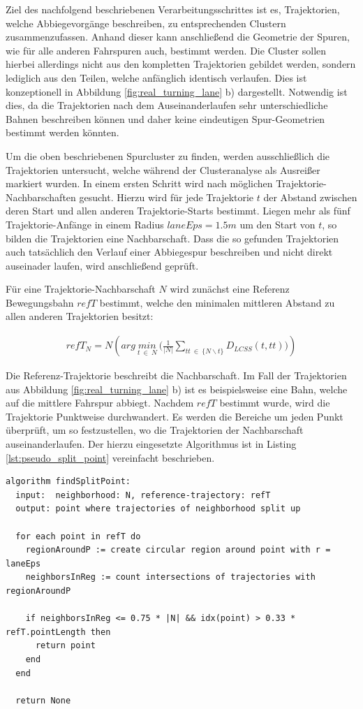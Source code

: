Ziel des nachfolgend beschriebenen Verarbeitungsschrittes ist es, Trajektorien, welche Abbiegevorgänge
beschreiben, zu entsprechenden Clustern zusammenzufassen. Anhand dieser kann anschließend die Geometrie
der Spuren, wie für alle anderen Fahrspuren auch, bestimmt werden.
Die Cluster sollen hierbei allerdings nicht aus den kompletten Trajektorien gebildet werden, sondern
lediglich aus den Teilen, welche anfänglich identisch verlaufen. Dies ist konzeptionell in Abbildung
\ref{fig:real_turning_lane} b) dargestellt. Notwendig ist dies, da die Trajektorien nach dem Auseinanderlaufen
sehr unterschiedliche Bahnen beschreiben können und daher keine eindeutigen Spur-Geometrien bestimmt werden könnten.

Um die oben beschriebenen Spurcluster zu finden, werden ausschließlich die Trajektorien untersucht,
welche während der Clusteranalyse als Ausreißer markiert wurden.
In einem ersten Schritt wird nach möglichen Trajektorie-Nachbarschaften gesucht. Hierzu wird für
jede Trajektorie $t$ der Abstand zwischen deren Start und allen anderen Trajektorie-Starts bestimmt.
Liegen mehr als fünf Trajektorie-Anfänge in einem Radius $laneEps = 1.5m$ um den Start von $t$, so bilden
die Trajektorien eine Nachbarschaft.
Dass die so gefunden Trajektorien auch tatsächlich den Verlauf einer Abbiegespur beschreiben und nicht
direkt auseinader laufen, wird anschließend geprüft.

Für eine Trajektorie-Nachbarschaft $N$ wird zunächst eine Referenz Bewegungsbahn $refT$ bestimmt, welche den
minimalen mittleren Abstand zu allen anderen Trajektorien besitzt:

\begin{ceqn}
\begin{align}
    refT_N = N(arg\ \underset{t\ \in\ N}{min}\ \Big(\frac{1}{|N|} \sum_{tt\ \in\ \{N \backslash t\}} D_{LCSS}(t, tt) \Big))
\end{align}
\end{ceqn}

Die Referenz-Trajektorie beschreibt die Nachbarschaft. Im Fall der Trajektorien aus Abbildung
\ref{fig:real_turning_lane} b) ist es beispielsweise eine Bahn, welche auf die mittlere Fahrspur abbiegt.
Nachdem $refT$ bestimmt wurde, wird die Trajektorie Punktweise durchwandert. Es werden die Bereiche um jeden
Punkt überprüft, um so festzustellen, wo die Trajektorien der Nachbarschaft auseinanderlaufen. Der hierzu
eingesetzte Algorithmus ist in Listing \ref{lst:pseudo_split_point} vereinfacht beschrieben.
\begin{lstlisting}[caption=Pseudocode Split-Punkt Bestimmung, language=Pseudo, label=lst:pseudo_split_point]
algorithm findSplitPoint:
  input:  neighborhood: N, reference-trajectory: refT
  output: point where trajectories of neighborhood split up

  for each point in refT do
    regionAroundP := create circular region around point with r = laneEps
    neighborsInReg := count intersections of trajectories with regionAroundP

    if neighborsInReg <= 0.75 * |N| && idx(point) > 0.33 * refT.pointLength then
      return point
    end
  end

  return None
\end{lstlisting}


